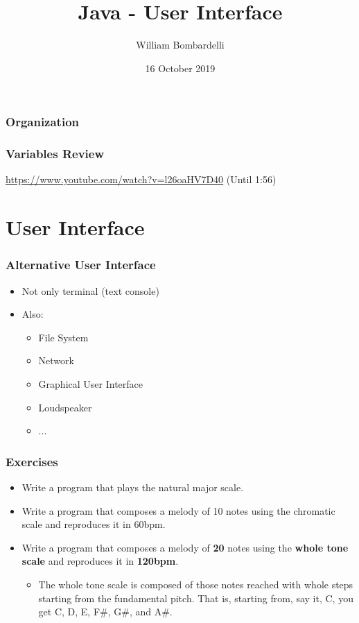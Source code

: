 \documentclass{beamer}
\title[Java]{Java - User Interface}
\author[W. Bombardelli]{William Bombardelli}
\institute[Schweizerschule Mexiko]
{
	\vskip 12pt
	Schweizerschule Mexiko, Ciudad de México, Mexico \\
	\texttt{\url{https://github.com/wbombardellis/java-unterricht}}
}
\date{16 October 2019}
\begin{document}
	\begin{frame}
		\titlepage
	\end{frame}
	
	\begin{frame}
		\frametitle{Organization}
		\tableofcontents
	\end{frame}

	\begin{frame}
		\frametitle{Variables Review}
		\url{https://www.youtube.com/watch?v=l26oaHV7D40} (Until 1:56)
	\end{frame}

	\section{User Interface}
	\begin{frame}
		\frametitle{Alternative User Interface}
		\begin{itemize}
			\item Not only terminal (text console)
			\item Also:
			\begin{itemize}
				\item File System
				\item Network
				\item Graphical User Interface
				\item Loudspeaker
				\item ...
			\end{itemize}
		\end{itemize}
	\end{frame}

	\begin{frame}
		\frametitle{Exercises}
		\begin{itemize}
			\item Write a program that plays the natural major scale.
			\pause
			\item Write a program that composes a melody of 10 notes using the chromatic scale and reproduces it in 60bpm.
			\pause
			\item Write a program that composes a melody of \textbf{20} notes using the \textbf{whole tone scale} and reproduces it in \textbf{120bpm}.
			\begin{itemize}
				\item The whole tone scale is composed of those notes reached with whole steps starting from the fundamental pitch. That is, starting from, say it, C, you get C, D, E, F\#, G\#, and A\#.
			\end{itemize}
		\end{itemize}
	\end{frame}
\end{document}
